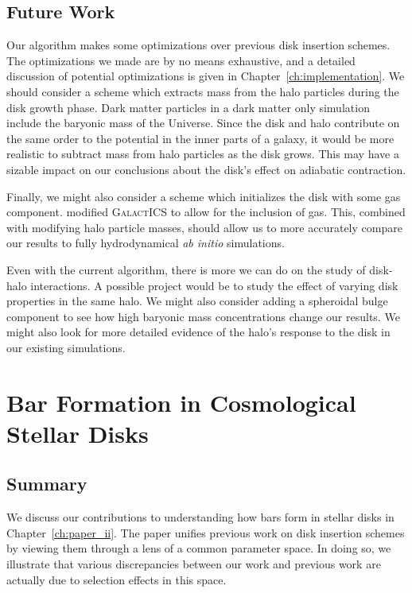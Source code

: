 \subsection{Future Work}

Our algorithm makes some optimizations over previous disk insertion schemes. The optimizations we made are by no means exhaustive, and a detailed discussion of potential optimizations is given in Chapter~\ref{ch:implementation}. We should consider a scheme which extracts mass from the halo particles during the disk growth phase. Dark matter particles in a dark matter only simulation include the baryonic mass of the Universe. Since the disk and halo contribute on the same order to the potential in the inner parts of a galaxy, it would be more realistic to subtract mass from halo particles as the disk grows. This may have a sizable impact on our conclusions about the disk's effect on adiabatic contraction.

Finally, we might also consider a scheme which initializes the disk with some gas component. \citet{deg_2019} modified \textsc{GalactICS} to allow for the inclusion of gas. This, combined with modifying halo particle masses, should allow us to more accurately compare our results to fully hydrodynamical \textit{ab initio} simulations.


Even with the current algorithm, there is more we can do on the study of disk-halo interactions. A possible project would be to study the effect of varying disk properties in the same halo. We might also consider adding a spheroidal bulge component to see how high baryonic mass concentrations change our results. We might also look for more detailed evidence of the halo's response to the disk in our existing simulations.


\section{Bar Formation in Cosmological Stellar Disks}
\subsection{Summary}

We discuss our contributions to understanding how bars form in stellar disks in Chapter~\ref{ch:paper_ii}. The paper unifies previous work on disk insertion schemes by viewing them through a lens of a common parameter space. In doing so, we illustrate that various discrepancies between our work and previous work are actually due to selection effects in this space. 

